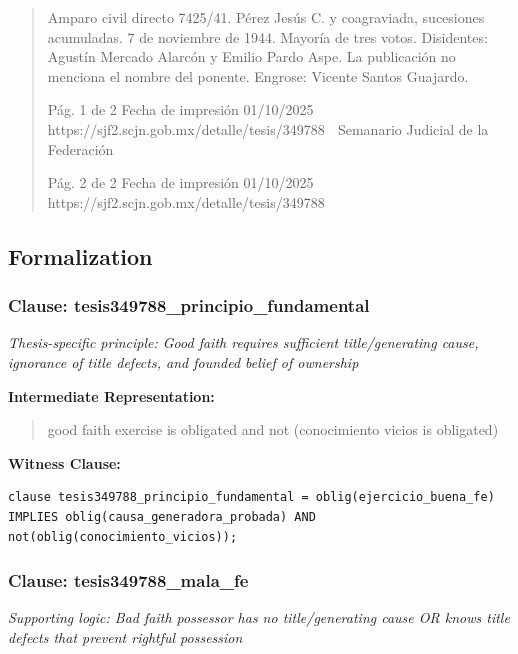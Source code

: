 \documentclass[11pt,a4paper]{article}
\begin{document}
\begin{quote}
Amparo civil directo 7425/41. Pérez Jesús C. y coagraviada, sucesiones acumuladas. 7 de
noviembre de 1944. Mayoría de tres votos. Disidentes: Agustín Mercado Alarcón y Emilio Pardo
Aspe. La publicación no menciona el nombre del ponente. Engrose: Vicente Santos Guajardo.

                                               Pág. 1 de 2              Fecha de impresión 01/10/2025
  https://sjf2.scjn.gob.mx/detalle/tesis/349788
                                                Semanario Judicial de la Federación




                                           Pág. 2 de 2       Fecha de impresión 01/10/2025
https://sjf2.scjn.gob.mx/detalle/tesis/349788

\end{quote}

\subsection{Formalization}

\subsubsection{Clause: tesis349788\_principio\_fundamental}

\textit{Thesis-specific principle: Good faith requires sufficient title/generating cause, ignorance of title defects, and founded belief of ownership}

\textbf{Intermediate Representation:}

\begin{quote}
good faith exercise is obligated and not (conocimiento vicios is obligated)
\end{quote}

\textbf{Witness Clause:}

\begin{lstlisting}[style=witnessstyle, language=Witness]
clause tesis349788_principio_fundamental = oblig(ejercicio_buena_fe) IMPLIES oblig(causa_generadora_probada) AND not(oblig(conocimiento_vicios));
\end{lstlisting}

\subsubsection{Clause: tesis349788\_mala\_fe}

\textit{Supporting logic: Bad faith possessor has no title/generating cause OR knows title defects that prevent rightful possession}
\end{document}
